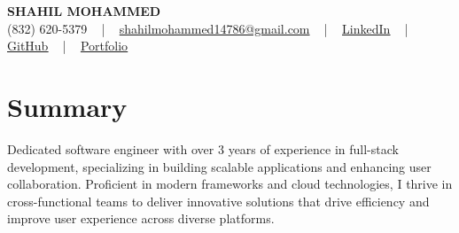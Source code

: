 \documentclass[letterpaper,10pt]{article}
\begin{document}
\begin{center}
    {\fontsize{14pt}{12pt}\selectfont \textbf{\MakeUppercase{Shahil Mohammed}}}\\ \vspace{2pt}
    \fontsize{10pt}{12pt}\selectfont (832) 620-5379 ~ | ~ \href{mailto:shahilmohammed14786@gmail.com}{shahilmohammed14786@gmail.com} ~ | ~  
    \href{https://www.linkedin.com/in/shahil-mohammed-9652931a1/}{\color{blue}\underline{LinkedIn}}  ~ | ~ 
    \href{https://github.com/freakbeast14}{\color{blue}\underline{GitHub}} ~ | ~ 
    \href{https://shahil-mohammed.netlify.app/}{\color{blue}\underline{Portfolio}}
    \vspace{-8pt}
\end{center}

\section{Summary}
\vspace{-2pt}\fontsize{8pt}{9pt}\selectfont
Dedicated software engineer with over 3 years of experience in full-stack development, specializing in building scalable applications and enhancing user collaboration. Proficient in modern frameworks and cloud technologies, I thrive in cross-functional teams to deliver innovative solutions that drive efficiency and improve user experience across diverse platforms. 
 \vspace{-5pt}
 
\vspace{-2pt}
\end{document}
